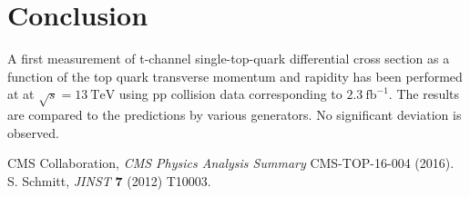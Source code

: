 \documentclass[12pt]{article}
\begin{document}
\section{Conclusion}

A first measurement of t-channel single-top-quark differential cross section as a function of the top quark transverse momentum and rapidity has been performed at at $\sqrt{s}=13~\mathrm{TeV}$ using pp collision data corresponding to $2.3~\mathrm{fb}^{-1}$. The results are compared to the predictions by various generators. No significant deviation is observed.

\begin{thebibliography}{99}

 CMS Collaboration, \emph{CMS Physics Analysis Summary} CMS-TOP-16-004 (2016).
 S. Schmitt, \emph{JINST} \textbf{7} (2012) T10003.

\end{thebibliography}

 
\end{document}
